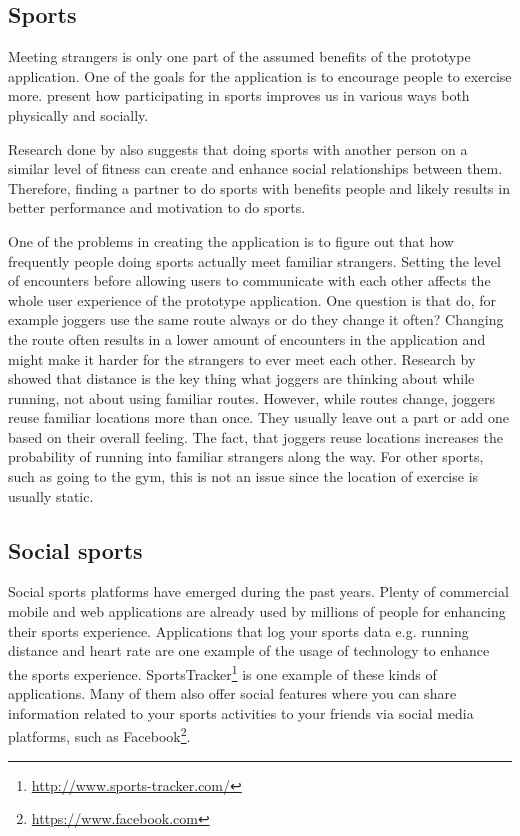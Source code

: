 \subsection{Sports}

Meeting strangers is only one part of the assumed benefits of the prototype application. One of the goals for the application is to encourage people to exercise more. \cite{foundations} present how participating in sports improves us in various ways both physically and socially.

Research done by \cite{joggingTheDistance} also suggests that doing sports with another person on a similar level of fitness can create and enhance social relationships between them. Therefore, finding a partner to do sports with benefits people and likely results in better performance and motivation to do sports.

One of the problems in creating the application is to figure out that how frequently people doing sports actually meet familiar strangers. Setting the level of encounters before allowing users to communicate with each other affects the whole user experience of the prototype application. One question is that do, for example joggers use the same route always or do they change it often? Changing the route often results in a lower amount of encounters in the application and might make it harder for the strangers to ever meet each other. Research by \cite{runningNavigation} showed that distance is the key thing what joggers are thinking about while running, not about using familiar routes. However, while routes change, joggers reuse familiar locations more than once. They usually leave out a part or add one based on their overall feeling. The fact, that joggers reuse locations increases the probability of running into familiar strangers along the way. For other sports, such as going to the gym, this is not an issue since the location of exercise is usually static.

\subsection{Social sports}

Social sports platforms have emerged during the past years. Plenty of commercial mobile and web applications  are already used by millions of people for enhancing their sports experience. Applications that log your sports data e.g. running distance and heart rate are one example of the usage of technology to enhance the sports experience. SportsTracker\footnote{\url{http://www.sports-tracker.com/}} is one example of these kinds of applications. Many of them also offer social features where you can share information related to your sports activities to your friends via social media platforms, such as Facebook\footnote{\url{https://www.facebook.com}}.

